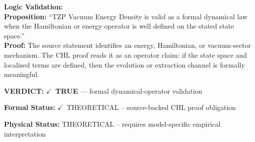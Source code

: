 \textbf{Logic Validation:}\\
\textbf{Proposition:} ``TZP Vacuum Energy Density is valid as a formal dynamical law when the Hamiltonian or
energy operator is well defined on the stated state space.''\\
\textbf{Proof:} The source statement identifies an energy, Hamiltonian, or vacuum-sector mechanism. The
CHL proof reads it as an operator claim: if the state space and localized terms are
defined, then the evolution or extraction channel is formally meaningful.

\textbf{VERDICT:} \ensuremath{\checkmark}\ \textbf{TRUE} --- formal dynamical-operator validation

\textbf{Formal Status:} \ensuremath{\checkmark}\ THEORETICAL -- source-backed CHL proof obligation

\textbf{Physical Status:} THEORETICAL -- requires model-specific empirical interpretation
\par\vspace{0.45em}
\par
\ifTZPDarkEdition
{}
\fi
\endgroup
\endgroup
